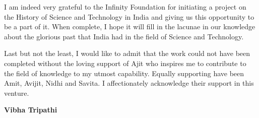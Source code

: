 I am indeed very grateful to the Infinity Foundation for initiating a project on the History of Science and Technology in India and giving us this opportunity to be a part of it. When complete, I hope it will fill in the lacunae in our knowledge about the glorious past that India had in the field of Science and Technology.

Last but not the least, I would like to admit that the work could not have been completed without the loving support of Ajit who inspires me to contribute to the field of knowledge to my utmost capability. Equally supporting have been Amit, Avijit, Nidhi and Savita. I affectionately acknowledge their support in this venture. 

\begin{flushright}
 \textbf{Vibha Tripathi}
\end{flushright}

\label{endpreface6}
